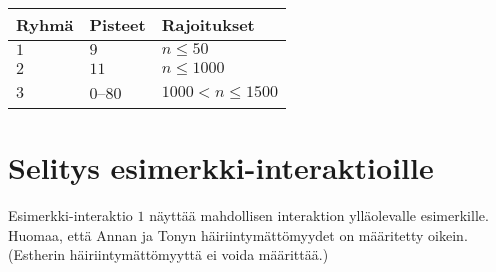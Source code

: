 \medskip
\begin{tabular}{lll}
Ryhmä & Pisteet & Rajoitukset\\\hline
$1$  &  $9$ & $n\leq 50$\\
$2$  &  $11$ & $n\leq 1000$\\
$3$  &  $0$--$80$ & $1000 < n\leq 1500$\\
\end{tabular}

\section*{Selitys esimerkki-interaktioille}

Esimerkki-interaktio $1$ näyttää mahdollisen interaktion ylläolevalle esimerkille.
Huomaa, että Annan ja Tonyn häi\-riin\-ty\-mät\-tö\-myy\-det on määritetty oikein. 
(Estherin häiriintymättömyyttä ei voida määrittää.)

